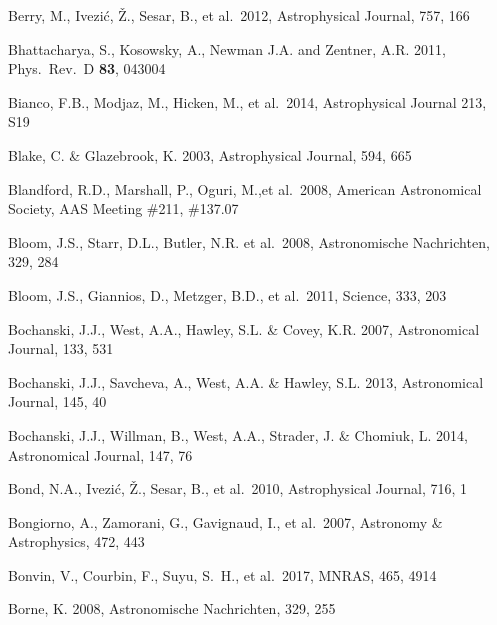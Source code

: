 \documentclass[twocolumn]{aastex61}
\begin{document}
\begin{thebibliography}{}
 Berry, M., Ivezi\'c, \v Z., Sesar, B., et al.~2012, Astrophysical Journal, 757, 166

 Bhattacharya, S., Kosowsky, A., Newman J.A. and Zentner, A.R. 2011, Phys.\ Rev.\ D {\bf 83}, 043004

 Bianco, F.B., Modjaz, M., Hicken, M., et al.~2014, Astrophysical Journal 213, S19

 Blake, C. \& Glazebrook, K. 2003, Astrophysical Journal, 594, 665

 Blandford, R.D., Marshall, P., Oguri, M.,et al.~2008, American Astronomical Society, AAS Meeting \#211, \#137.07

 Bloom, J.S., Starr, D.L., Butler, N.R. et al.~2008, Astronomische Nachrichten, 329, 284


 Bloom, J.S., Giannios, D., Metzger, B.D., et al.~2011, Science, 333, 203

 Bochanski, J.J., West, A.A., Hawley, S.L. \& Covey, K.R. 2007, Astronomical Journal, 133, 531

 Bochanski, J.J., Savcheva, A., West, A.A. \& Hawley, S.L. 2013, Astronomical Journal, 145, 40

 Bochanski, J.J., Willman, B., West, A.A., Strader, J. \& Chomiuk, L. 2014, Astronomical Journal, 147, 76

 Bond, N.A.,  Ivezi\'{c}, \v{Z}., Sesar, B., et al.~2010, Astrophysical Journal, 716, 1

 Bongiorno, A., Zamorani, G., Gavignaud, I., et al.~2007, Astronomy \& Astrophysics, 472, 443

 Bonvin, V., Courbin, F., Suyu, S.~H., et al.\ 2017, MNRAS, 465, 4914

 Borne, K. 2008, Astronomische Nachrichten, 329, 255


\end{thebibliography}
\end{document}
